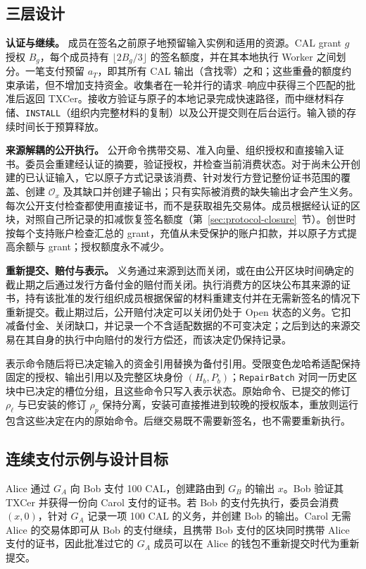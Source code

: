 \subsection{三层设计}
\label{sec:model-layers}
\noindent\textbf{认证与继续。}
成员在签名之前原子地预留输入实例和适用的资源。CAL grant $g$ 授权 $B_g$，每个成员持有 $\lfloor2B_g/3\rfloor$ 的签名额度，并在其本地执行 Worker 之间划分。一笔支付预留 $a_T$，即其所有 CAL 输出（含找零）之和；这些重叠的额度约束承诺，但不增加支持资金。收集者在一轮并行的请求--响应中获得三个匹配的批准后返回 TXCer。接收方验证与原子的本地记录完成快速路径，而中继材料存储、\texttt{INSTALL}（组织内完整材料的复制）以及公开提交则在后台运行。输入锁的存续时间长于预算释放。

\noindent\textbf{来源解耦的公开执行。}
公开命令携带交易、准入向量、组织授权和直接输入证书。委员会重建经认证的摘要，验证授权，并检查当前消费状态。对于尚未公开创建的已认证输入，它以原子方式记录该消费、针对发行方登记整份证书范围的覆盖、创建 $\mathcal O_x$ 及其缺口并创建子输出；只有实际被消费的缺失输出才会产生义务。每次公开支付检查都使用直接证书，而不是获取祖先交易体。成员根据经认证的区块，对照自己所记录的扣减恢复签名额度（第~\ref{sec:protocol-closure}~节）。创世时按每个支持账户检查汇总的 grant，充值从未受保护的账户扣款，并以原子方式提高余额与 grant；授权额度永不减少。

\noindent\textbf{重新提交、赔付与表示。}
义务通过来源到达而关闭，或在由公开区块时间确定的截止期之后通过发行方备付金的赔付而关闭。执行消费方的区块公布其来源的证书，持有该批准的发行组织成员根据保留的材料重建支付并在无需新签名的情况下重新提交。截止期过后，公开赔付决定可以关闭仍处于 Open 状态的义务。它扣减备付金、关闭缺口，并记录一个不含适配数据的不可变决定；之后到达的来源交易在其自身的执行中向赔付的发行方偿还，而该决定仍保持记录。

表示命令随后将已决定输入的资金引用替换为备付引用。受限变色龙哈希适配保持固定的授权、输出引用以及完整区块身份 $(H_b,P_b)$；\texttt{RepairBatch} 对同一历史区块中已决定的槽位分组，且这些命令只写入表示状态。原始命令、已提交的修订 $\rho_\ell$ 与已安装的修订 $\rho_p$ 保持分离，安装可直接推进到较晚的授权版本，重放则运行包含这些决定在内的原始命令。后继交易既不需要新签名，也不需要重新执行。

\subsection{连续支付示例与设计目标}
\label{sec:model-example}
Alice 通过 $G_A$ 向 Bob 支付 100 CAL，创建路由到 $G_B$ 的输出 $x$。Bob 验证其 TXCer 并获得一份向 Carol 支付的证书。若 Bob 的支付先执行，委员会消费 $(x,0)$，针对 $G_A$ 记录一项 100 CAL 的义务，并创建 Bob 的输出。Carol 无需 Alice 的交易体即可从 Bob 的支付继续，且携带 Bob 支付的区块同时携带 Alice 支付的证书，因此批准过它的 $G_A$ 成员可以在 Alice 的钱包不重新提交时代为重新提交。

